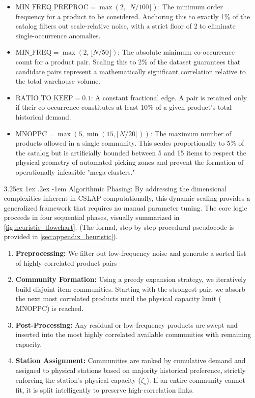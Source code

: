 \documentclass[preprint,review,11pt,authoryear]{elsarticle}
\makeatletter
\renewcommand\paragraph{\@startsection{paragraph}{4}{\z@}
  {3.25ex \@plus1ex \@minus.2ex}
  {-1em}
  {\normalfont\normalsize\itshape}}
\makeatother
\begin{document}
\begin{itemize}
    \item \(\mathrm{MIN\_FREQ\_PREPROC} = \max(2, \lfloor N / 100 \rfloor)\): The minimum order frequency for a product to be considered. Anchoring this to exactly 1\% of the catalog filters out scale-relative noise, with a strict floor of 2 to eliminate single-occurrence anomalies.
    \item \(\mathrm{MIN\_FREQ} = \max(2, \lfloor N / 50 \rfloor)\): The absolute minimum co-occurrence count for a product pair. Scaling this to 2\% of the dataset guarantees that candidate pairs represent a mathematically significant correlation relative to the total warehouse volume.
    \item \(\mathrm{RATIO\_TO\_KEEP} = 0.1\): A constant fractional edge. A pair is retained only if their co-occurrence constitutes at least 10\% of a given product's total historical demand.
    \item \(\mathrm{MNOPPC} = \max(5, \min(15, \lfloor N / 20 \rfloor))\): The maximum number of products allowed in a single community. This scales proportionally to 5\% of the catalog but is artificially bounded between 5 and 15 items to respect the physical geometry of automated picking zones and prevent the formation of operationally infeasible "mega-clusters."
\end{itemize}

\paragraph{Algorithmic Phasing:}
By addressing the dimensional complexities inherent in CSLAP computationally, this dynamic scaling provides a generalized framework that requires no manual parameter tuning. The core logic proceeds in four sequential phases, visually summarized in \cref{fig:heuristic_flowchart}. (The formal, step-by-step procedural pseudocode is provided in \ref{sec:appendix_heuristic}).

\begin{enumerate}
    \item \textbf{Preprocessing:} We filter out low-frequency noise and generate a sorted list of highly correlated product pairs %
    \item \textbf{Community Formation:} Using a greedy expansion strategy, we iteratively build disjoint item communities. Starting with the strongest pair, we absorb the next most correlated products until the physical capacity limit ($\mathrm{MNOPPC}$) is reached.
    \item \textbf{Post-Processing:} Any residual or low-frequency products are swept and inserted into the most highly correlated available communities with remaining capacity.
    \item \textbf{Station Assignment:} Communities are ranked by cumulative demand and assigned to physical stations based on majority historical preference, strictly enforcing the station's physical capacity ($\zeta_s$). If an entire community cannot fit, it is split intelligently to preserve high-correlation links.
\end{enumerate}
\end{document}
